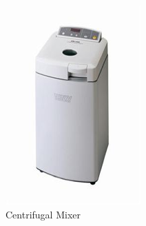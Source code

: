 \documentclass{article}
\begin{document}
\begin{multicols}{2}
    \begin{figure}[H]
            \includegraphics[width=.3\textwidth]{img/centrifugal.png}\hfill
            \caption{Centrifugal Mixer}
        \end{figure}
    \end{multicols}
\end{document}
